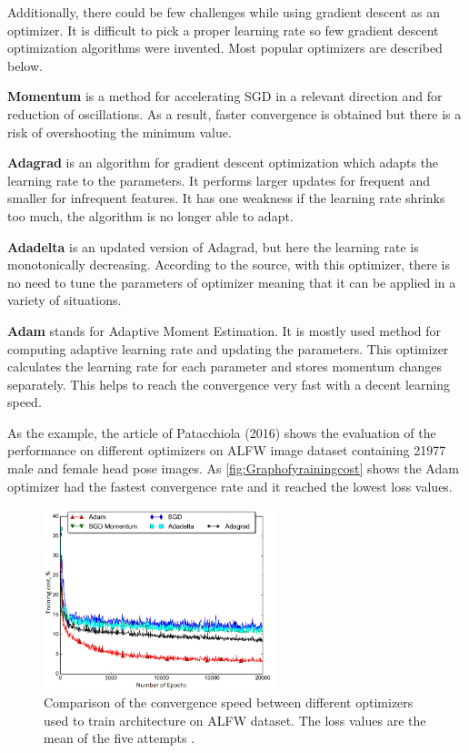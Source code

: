 Additionally, there could be few challenges while using gradient descent as an optimizer. It is difficult to pick a proper learning rate so few gradient descent optimization algorithms were invented. Most popular optimizers are described below.

\noindent
\textbf{Momentum} is a method for accelerating SGD in a relevant direction and for reduction of oscillations. As a result, faster convergence is obtained but there is a risk of overshooting the minimum value.\citep{Qian1999}

\noindent
\textbf{Adagrad} is an algorithm for gradient descent optimization which adapts the learning rate to the parameters. It performs larger updates for frequent and smaller for infrequent features. It has one weakness if the learning rate shrinks too much, the algorithm is no longer able to adapt.\citep{Ruder2016}

\noindent
\textbf{Adadelta} is an updated version of Adagrad, but here the learning rate is monotonically decreasing. According to the source, with this optimizer, there is no need to tune the parameters of optimizer meaning that it can be applied in a variety of situations.\citep{Ruder2016}

\noindent
\textbf{Adam} stands for Adaptive Moment Estimation. It is mostly used method for computing adaptive learning rate and updating the parameters.  This optimizer calculates the learning rate for each parameter and stores momentum changes separately. This helps to reach the convergence very fast with a decent learning speed.\citep{Kingma2015}

As the example, the article of Patacchiola (2016) shows the evaluation of the performance on different optimizers on ALFW image dataset containing 21977 male and female head pose images. As \autoref{fig:Graphofyrainingcost} shows the Adam optimizer had the fastest convergence rate and it reached the lowest loss values. 

\begin{figure} [H]
\centering
\includegraphics[width=0.6\textwidth]{figures/Graphofyrainingcost}
\caption{Comparison of the convergence speed between different optimizers used to train architecture on ALFW dataset. The loss values are the mean of the five attempts \citep{Patacchiola2017}.}
\label{fig:Graphofyrainingcost}  
\end{figure}

